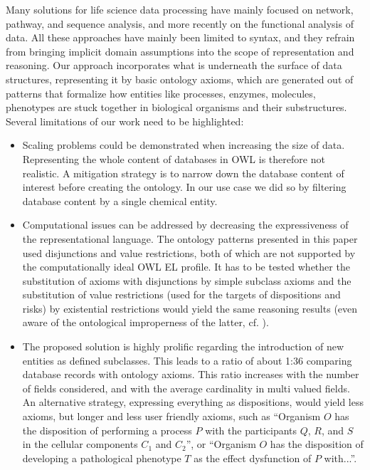 Many solutions for life science data processing have mainly focused on network, pathway, and sequence analysis, and more recently on the functional analysis of data. All these approaches have mainly been limited to syntax, and they refrain from bringing implicit domain assumptions into the scope of representation and reasoning. Our approach incorporates what is underneath the surface of data structures, representing it by basic ontology axioms, which are generated out of patterns that formalize how entities like processes, enzymes, molecules, phenotypes are stuck together in biological organisms and their substructures.   
Several limitations of our work need to be highlighted: 

\begin{itemize}
	\item Scaling problems could be demonstrated when increasing the size of data. Representing the whole content of databases in OWL is therefore not realistic. A mitigation strategy is to narrow down the database content of interest before creating the ontology. In our use case we did so by filtering database content by a single chemical entity.  
	\item Computational issues can be addressed by decreasing the expressiveness of the representational language. The ontology patterns presented in this paper used disjunctions and value restrictions, both of which are not supported by the computationally ideal OWL EL profile. It has to be tested whether the substitution of axioms with disjunctions by simple subclass axioms and the substitution of value restrictions (used for the targets of dispositions and risks) by existential restrictions would yield the same reasoning results (even aware of the ontological improperness of the latter, cf. \cite{schulz2014}).
	\item
	The proposed solution is highly prolific regarding the introduction of new entities as defined subclasses. This leads to a ratio of about 1:36 comparing database records with ontology axioms. This ratio increases with the number of fields considered, and with the average cardinality in multi valued fields. An alternative strategy, expressing everything as dispositions, would yield less axioms, but longer and less user friendly axioms, such as ``Organism $O$ has the disposition of performing a process $P$ with the participants $Q$, $R$, and $S$ in the cellular components $C_1$ and $C_2$'', or ``Organism $O$ has the disposition of developing a pathological phenotype $T$ as the effect dysfunction of $P$ with...''. 

\end{itemize}
